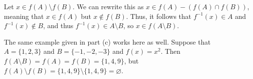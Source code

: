 \documentclass[11pt]{article}
\begin{document}
\begin{Parts}
    \begin{solution}
        Let $x \in f(A) \setminus f(B)$. We can rewrite this as $x \in f(A) - (f(A) \cap f(B))$, meaning that $x \in f(A)$ but $x \notin f(B)$. Thus, it follows that $f^{-1}(x) \in A$ and $f^{-1}(x) \notin B$, and thus $f^{-1}(x) \in A \setminus B$, so $x \in f(A \setminus B)$. 


        The same example given in part (c) works here as well. Suppose that $A = \{ 1, 2, 3\}$ and $B = \{-1, -2, -3\}$ and $f(x) = x^2$. Then $f(A \setminus B) = f(A) = f(B) = \{1, 4, 9\}$, but $f(A) \setminus f(B) = \{1, 4, 9\} \setminus \{1, 4, 9\} = \varnothing$.



        
    \end{solution}
\end{Parts}
\end{document}
